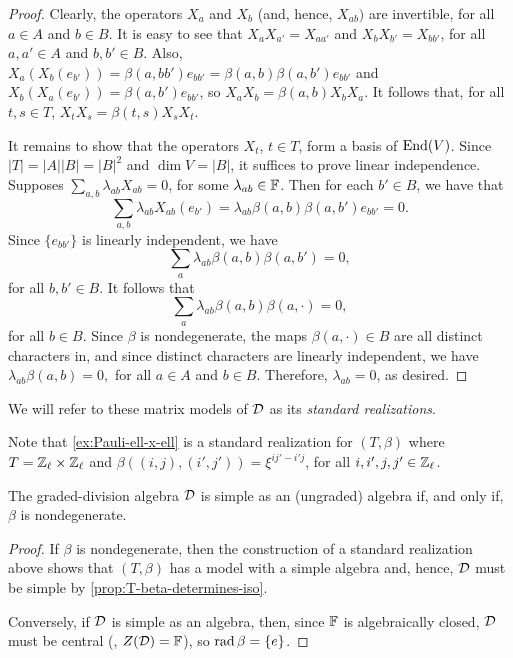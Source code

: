 \begin{proof}
    Clearly, the operators $X_a$ and $X_b$ (and, hence, $X_{ab})$ are invertible, for all $a\in A$ and $b\in B$. 
    It is easy to see that $X_a X_{a'} = X_{aa'}$ and $X_{b} X_{b'} = X_{bb'}$, for all $a, a' \in A$ and $b, b'\in B$. 
    Also, $X_a ( X_b(e_{b'}) ) = \beta(a, bb') e_{bb'} = \beta(a, b) \beta(a,b') e_{bb'}$ and $X_b ( X_a(e_{b'}) ) = \beta(a, b') e_{bb'}$, so $X_a X_b = \beta(a,b) X_b X_a$. 
    It follows that, for all $t,s \in T$, $X_t X_s = \beta(t,s) X_s X_t$.

    It remains to show that the operators $X_t$, $t\in T$, form a basis of $\operatorname{End}(V)$. 
    Since $|T| = |A||B| = |B|^2$ and $\dim V = |B|$, it suffices to prove linear independence. 
    Supposes $\sum_{a,b} \lambda_{ab} X_{ab} = 0$, for some $\lambda_{ab} \in \mathbb{F}$. 
    Then for each $b' \in B$, we have that
    \[
        \sum_{a,b} \lambda_{ab} X_{ab} (e_{b'}) = \lambda_{ab} \beta(a, b) \beta(a,b') e_{bb'} = 0.
    \]
    Since $\{ e_{bb'} \}$ is linearly independent, we have
    \[
        \sum_a \lambda_{ab} \beta(a, b) \beta(a,b') = 0,
    \]
    for all $b,b' \in B$. 
    It follows that
    \[
        \sum_a \lambda_{ab} \beta(a, b) \beta(a, \cdot) = 0,
    \]
    for all $b\in B$. 
    Since $\beta$ is nondegenerate, the maps $\beta(a, \cdot) \in \widehat B$ are all distinct characters in, and since distinct characters are linearly independent, we have
    $
        \lambda_{ab} \beta(a, b) = 0,
    $
    for all $a\in A$ and $b\in B$. 
    Therefore, $\lambda_{ab} = 0$, as desired. 
\end{proof}

\begin{defi}\label{def:standard-realization}
	We will refer to these matrix models of $\mathcal D$ as its \emph{standard realizations}.
\end{defi}

Note that \cref{ex:Pauli-ell-x-ell} is a standard realization for $(T, \beta)$ where $T = \mathbb{Z}_\ell \times \mathbb{Z}_\ell$ and $\beta ((i, j), (i', j')) = \xi^{ij' - i'j}$, for all $i, i', j, j' \in \mathbb{Z}_\ell$.

\begin{cor}\label{cor:D-simple-iff-beta-nondeg}
    The graded-division algebra $\mathcal{D}$ is simple as an (ungraded) algebra if, and only if, $\beta$ is nondegenerate. 
\end{cor}

\begin{proof}
    If $\beta$ is nondegenerate, then the construction of a standard realization above shows that $(T, \beta)$ has a model with a simple algebra and, hence, $\mathcal{D}$ must be simple by \cref{prop:T-beta-determines-iso}. 
    
    Conversely, if $\mathcal{D}$ is simple as an algebra, then, since $\mathbb{F}$ is algebraically closed, $\mathcal{D}$ must be central (\ie, $Z(\mathcal{D}) = \mathbb{F}$), so $\operatorname{rad} \beta = \{e\}$.
\end{proof}

